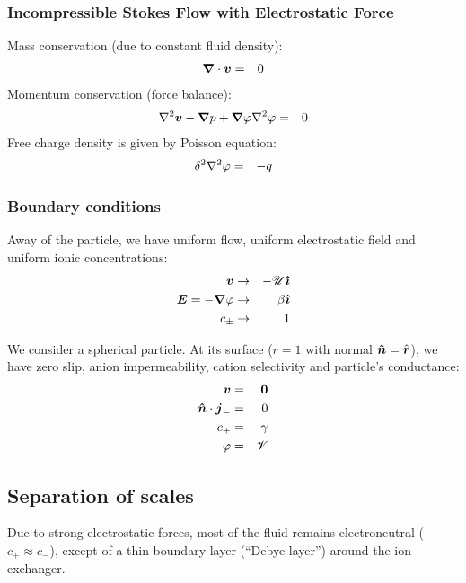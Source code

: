 \subsubsection{Incompressible Stokes Flow with Electrostatic Force}
Mass conservation (due to constant fluid density):
\begin{eqnarray}
\boldsymbol{\nabla} \cdot \boldsymbol{v} &=& 0
\end{eqnarray}
Momentum conservation (force balance):
\begin{eqnarray}
\nabla^2 \boldsymbol{v} - \boldsymbol{\nabla} p + \boldsymbol{\nabla} \varphi \nabla^2 \varphi &=& 0
\end{eqnarray}
Free charge density is given by Poisson equation:
\begin{eqnarray}
\delta^2 \nabla^2 \varphi &=& -q
\end{eqnarray}

\subsubsection{Boundary conditions}
Away of the particle, we have uniform flow, uniform electrostatic field
and uniform ionic concentrations:
\begin{eqnarray}
\boldsymbol{v} &\rightarrow& -\mathscr{U} \boldsymbol{\hat{\imath}} \\
\boldsymbol{E} = -\boldsymbol{\nabla} \varphi &\rightarrow& \beta\boldsymbol{\hat{\imath}} \\
c_\pm &\rightarrow& 1
\end{eqnarray}

We consider a spherical particle. At its surface ($r=1$ with normal $\boldsymbol{\hat{n}} = \hat{\boldsymbol{r}}$), 
we have zero slip, anion impermeability, cation selectivity and particle's conductance:
\begin{eqnarray}
\boldsymbol{v} & = & \boldsymbol{0} \\
\boldsymbol{\hat{n}} \cdot \boldsymbol{j}_- & = & 0 \\
c_+ & = & \gamma \\
\varphi & = & \mathscr{V}
\end{eqnarray}

\subsection{Separation of scales}
Due to strong electrostatic forces, 
most of the fluid remains electroneutral ($c_+ \approx c_-$), 
except of a thin boundary layer (``Debye layer'') around the ion exchanger. 

